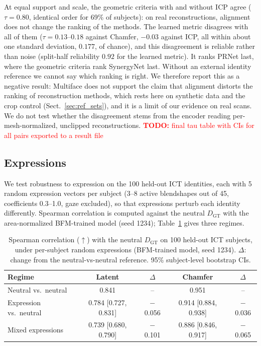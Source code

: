 \documentclass[10pt,twocolumn,letterpaper]{article}
\newcommand{\todo}[1]{\textcolor{red}{\textbf{TODO:} #1}}
\begin{document}
At equal support and scale, the geometric criteria with and without ICP agree ($\tau=0.80$, identical order for 69\% of subjects): on real reconstructions, alignment does not change the ranking of the methods. The learned metric disagrees with all of them ($\tau=0.13$--$0.18$ against Chamfer, $-0.03$ against ICP, all within about one standard deviation, $0.177$, of chance), and this disagreement is reliable rather than noise (split-half reliability $0.92$ for the learned metric). It ranks PRNet last, where the geometric criteria rank SynergyNet last. Without an external identity reference we cannot say which ranking is right. We therefore report this as a negative result: Multiface does not support the claim that alignment distorts the ranking of reconstruction methods, which rests here on synthetic data and the crop control (Sect.~\ref{sec:ref_sets}), and it is a limit of our evidence on real scans. We do not test whether the disagreement stems from the encoder reading per-mesh-normalized, unclipped reconstructions. \todo{final tau table with CIs for all pairs exported to a result file}

\subsection{Expressions}
\label{sec:expressions}
We test robustness to expression on the 100 held-out ICT identities, each with 5 random expression vectors per subject (3--8 active blendshapes out of 45, coefficients 0.3--1.0, gaze excluded), so that expressions perturb each identity differently. Spearman correlation is computed against the neutral $D_{\mathrm{GT}}$ with the area-normalized BFM-trained model (seed 1234); Table~\ref{tab:expressions} gives three regimes.

\begin{table}[!ht]
\centering
\small
\caption{Spearman correlation ($\uparrow$) with the neutral $D_{\mathrm{GT}}$ on 100 held-out ICT subjects, under per-subject random expressions (BFM-trained model, seed 1234). $\Delta$: change from the neutral-vs-neutral reference. 95\% subject-level bootstrap CIs.}
\label{tab:expressions}
\setlength{\tabcolsep}{4pt}
\begin{tabular}{lcccc}
\toprule
Regime & Latent & $\Delta$ & Chamfer & $\Delta$ \\
\midrule
Neutral vs.\ neutral & 0.841 & -- & 0.951 & -- \\
Expression vs.\ neutral & 0.784 [0.727, 0.831] & $-$0.056 & 0.914 [0.884, 0.938] & $-$0.036 \\
Mixed expressions & 0.739 [0.680, 0.790] & $-$0.101 & 0.886 [0.846, 0.917] & $-$0.065 \\
\bottomrule
\end{tabular}
\end{table}
\end{document}

